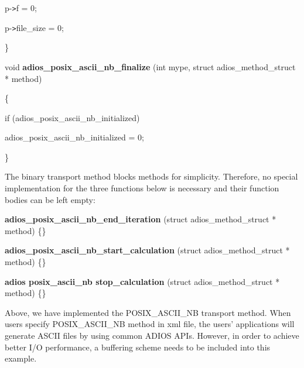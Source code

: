 \vspace{10pt}
p-\texttt{>}f = 0;

\vspace{10pt}
\parindent=28pt
p-\texttt{>}file\_size = 0; 

\vspace{10pt}
\parindent=0pt
\}

\vspace{23pt}
void {\color{color02} \textbf{adios\_posix\_ascii\_nb\_finalize}}\textbf{ }{\color{color02} (int 
mype, struct adios\_method\_struct * method)} 

\vspace{10pt}
\{

\vspace{10pt}
\parindent=14pt
if (adios\_posix\_ascii\_nb\_initialized)

\vspace{10pt}
\parindent=28pt
adios\_posix\_ascii\_nb\_initialized = 0; 

\vspace{10pt}
\parindent=0pt
\}

\vspace{36pt}
The binary transport method blocks methods for simplicity. Therefore,  no special 
implementation for the three functions below is necessary and their function bodies 
can be left empty:

\vspace{23pt}
{\color{color02} \textbf{adios\_posix\_ascii\_nb\_end\_iteration}}{\color{color02}  
(struct adios\_method\_struct * method) }\{\}

\vspace{10pt}
{\color{color02} \textbf{adios\_posix\_ascii\_nb\_start\_calculation}}{\color{color02}  
(struct adios\_method\_struct * method) }\{\}

\vspace{10pt}
{\color{color02} \textbf{adios posix\_ascii\_nb stop\_calculation}}{\color{color02}  
(struct adios\_method\_struct * method)} \{\}

\vspace{23pt}
Above, we have implemented the POSIX\_ASCII\_NB transport method. When users specify 
POSIX\_ASCII\_NB method in xml file, the users' applications will generate ASCII 
files by using common ADIOS APIs. However, in order to achieve better I/O performance, 
a buffering scheme needs to be included into this example.\label{HToc82067540}\label{HToc84890315}\label{HToc212016690}\label{HToc212016932}\label{HToc182553457}

